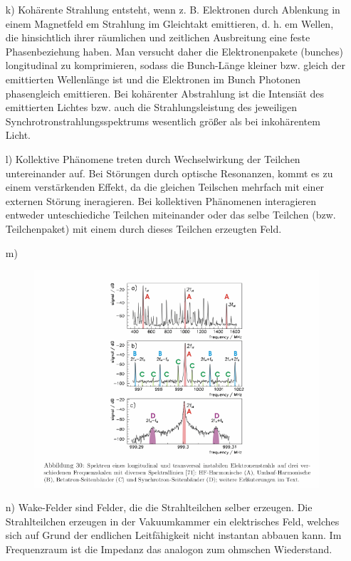 \documentclass[11pt,a4paper]{article}
\begin{document}
\begin{itemize}
		\item[k)]
			Kohärente Strahlung entsteht, wenn z. B. Elektronen durch Ablenkung in einem Magnetfeld em Strahlung im Gleichtakt emittieren, d. h. 
			em Wellen, die hinsichtlich ihrer räumlichen und zeitlichen Ausbreitung eine feste Phasenbeziehung haben. Man versucht daher die Elektronenpakete (bunches)
			longitudinal zu komprimieren, sodass die Bunch-Länge kleiner bzw. gleich der emittierten Wellenlänge ist und die Elektronen im Bunch Photonen phasengleich emittieren.
			Bei kohärenter Abstrahlung ist die Intensiät des emittierten
			Lichtes bzw. auch die Strahlungsleistung des jeweiligen Synchrotronstrahlungsspektrums wesentlich größer als bei inkohärentem Licht.
		
		\item[l)]
			Kollektive Phänomene treten durch Wechselwirkung der Teilchen untereinander auf.
			Bei Störungen durch optische Resonanzen, kommt es zu einem verstärkenden Effekt, 
			da die gleichen Teilschen mehrfach mit einer externen Störung ineragieren.
			Bei kollektiven Phänomenen interagieren entweder unteschiediche Teilchen miteinander 
			oder das selbe Teilchen (bzw. Teilchenpaket) mit einem durch dieses Teilchen erzeugten Feld.

		\item[m)]
			\begin{figure}[H]
				\centering
				\includegraphics[width=\textwidth]{sprektrum.png}
			\end{figure}
		
		\item[n)]
			Wake-Felder sind Felder, die die Strahlteilchen selber erzeugen.
			Die Strahlteilchen erzeugen in der Vakuumkammer ein elektrisches Feld,
			welches sich auf Grund der endlichen Leitfähigkeit nicht instantan abbauen kann.
			Im Frequenzraum ist die Impedanz das analogon zum ohmschen Wiederstand.
		

\end{itemize}
\end{document}
